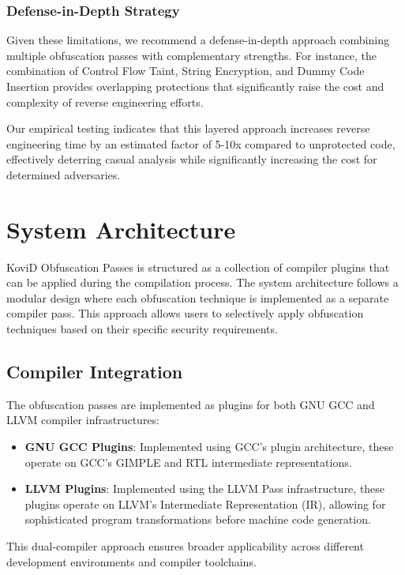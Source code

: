 \documentclass[conference]{IEEEtran}
\begin{document}
\subsubsection{Defense-in-Depth Strategy}
Given these limitations, we recommend a defense-in-depth approach combining multiple obfuscation passes with complementary strengths. For instance, the combination of Control Flow Taint, String Encryption, and Dummy Code Insertion provides overlapping protections that significantly raise the cost and complexity of reverse engineering efforts.

Our empirical testing indicates that this layered approach increases reverse engineering time by an estimated factor of 5-10x compared to unprotected code, effectively deterring casual analysis while significantly increasing the cost for determined adversaries.

\section{System Architecture}
KoviD Obfuscation Passes is structured as a collection of compiler plugins that can be applied during the compilation process. The system architecture follows a modular design where each obfuscation technique is implemented as a separate compiler pass. This approach allows users to selectively apply obfuscation techniques based on their specific security requirements.

\subsection{Compiler Integration}
The obfuscation passes are implemented as plugins for both GNU GCC and LLVM compiler infrastructures:

\begin{itemize}
    \item \textbf{GNU GCC Plugins}: Implemented using GCC's plugin architecture, these operate on GCC's GIMPLE and RTL intermediate representations.
    \item \textbf{LLVM Plugins}: Implemented using the LLVM Pass infrastructure, these plugins operate on LLVM's Intermediate Representation (IR), allowing for sophisticated program transformations before machine code generation.
\end{itemize}

This dual-compiler approach ensures broader applicability across different development environments and compiler toolchains.
\end{document}
